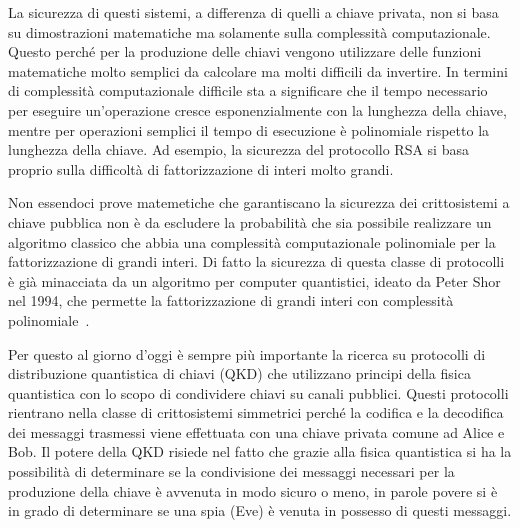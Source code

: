 La sicurezza di questi sistemi, a differenza di quelli a chiave privata, non si basa su dimostrazioni matematiche ma solamente sulla complessit\`a computazionale. Questo perch\'e per la produzione delle chiavi vengono utilizzare delle funzioni matematiche molto semplici da calcolare ma molti difficili da invertire. In termini di complessit\`a computazionale difficile sta a significare che il tempo necessario per eseguire un'operazione cresce esponenzialmente con la lunghezza della chiave, mentre per operazioni semplici il tempo di esecuzione \`e polinomiale rispetto la lunghezza della chiave. Ad esempio, la sicurezza del protocollo RSA si basa proprio sulla difficolt\`a di fattorizzazione di interi molto grandi.

Non essendoci prove matemetiche che garantiscano la sicurezza dei crittosistemi a chiave pubblica non \`e da escludere la probabilit\`a che sia possibile realizzare un algoritmo classico che abbia una complessit\`a computazionale polinomiale per la fattorizzazione di grandi interi. Di fatto la sicurezza di questa classe di protocolli \`e gi\`a minacciata da un algoritmo per computer quantistici, ideato da Peter Shor nel 1994, che permette la fattorizzazione di grandi interi con complessit\`a polinomiale~\cite{365700}.

Per questo al giorno d'oggi \`e sempre pi\`u importante la ricerca su protocolli di distribuzione quantistica di chiavi (QKD) che utilizzano principi della fisica quantistica con lo scopo di condividere chiavi su canali pubblici. Questi protocolli rientrano nella classe di crittosistemi simmetrici perch\'e la codifica e la decodifica dei messaggi trasmessi viene effettuata con una chiave privata comune ad Alice e Bob. Il potere della QKD risiede nel fatto che grazie alla fisica quantistica si ha la possibilit\`a di determinare se la condivisione dei messaggi necessari per la produzione della chiave \`e avvenuta in modo sicuro o meno, in parole povere si \`e in grado di determinare se una spia (Eve) \`e venuta in possesso di questi messaggi.

